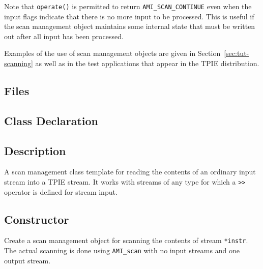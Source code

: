     Note that \lstinline|operate()| is permitted to return
    \lstinline|AMI_SCAN_CONTINUE| even when the input flags
    indicate that there is no more input to be processed.
    This is useful if the scan management object maintains
    some internal state that must be written out after all
    input has been processed.  


Examples of the use of scan management objects are given in
Section~\ref{sec:tut-scanning} as well as in the test applications that
appear in the TPIE distribution.




\subsection{Files}
  \btabb
     {}
  \etabb


\subsection{Class Declaration}
  \btabb
     {}
  \etabb

\subsection{Description}
A scan management class template for reading the contents of an
ordinary \CPP{} input stream into a TPIE stream.  It works with
streams of any type for which a \lstinline|>>| operator is defined for \CPP{}
stream input.

\subsection{Constructor}
  \btabb
     {Create a
scan management object for scanning the contents of \CPP{} stream
\lstinline|*instr|. The actual scanning is done using \lstinline|AMI_scan| with
no input streams and one output stream.}
  \etabb



